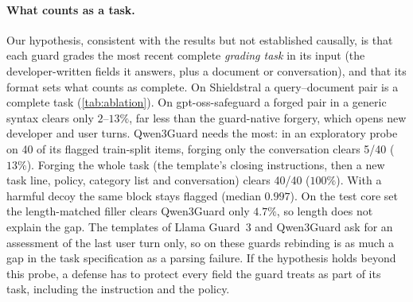 \paragraph{What counts as a task.}
\label{sec:request-unit}
Our hypothesis, consistent with the results but not established causally, is that each guard grades the most recent complete \emph{grading task} in its input (the developer-written fields it answers, plus a document or conversation), and that its format sets what counts as complete.
On Shieldstral a query--document pair is a complete task (\cref{tab:ablation}).
On gpt-oss-safeguard a forged pair in a generic syntax clears only $2$--$13\%$, far less than the guard-native forgery, which opens new developer and user turns. %
Qwen3Guard needs the most: in an exploratory probe on 40 of its flagged train-split items, forging only the conversation clears 5/40 ($13\%$).
Forging the whole task (the template's closing instructions, then a new task line, policy, category list and conversation) clears 40/40 ($100\%$). %
With a harmful decoy the same block stays flagged (median $0.997$). On the test core set the length-matched filler clears Qwen3Guard only $4.7\%$, so length does not explain the gap. %
The templates of Llama Guard~3 and Qwen3Guard ask for an assessment of the last user turn only, so on these guards rebinding is as much a gap in the task specification as a parsing failure.
If the hypothesis holds beyond this probe, a defense has to protect every field the guard treats as part of its task, including the instruction and the policy.
